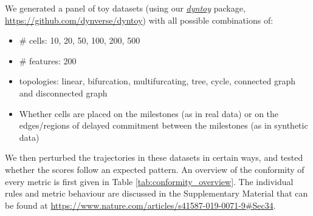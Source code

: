 We generated a panel of toy datasets (using our \href{https://github.com/dynverse/dyntoy}{\textit{dyntoy}} package, \href{https://github.com/dynverse/dyntoy}{https://github.com/dynverse/dyntoy}) with all possible combinations of:

\begin{itemize}
	\item \# cells: 10, 20, 50, 100, 200, 500
	\item \# features: 200
	\item topologies: linear, bifurcation, multifurcating, tree, cycle, connected graph and disconnected graph
	\item Whether cells are placed on the milestones (as in real data) or on the edges/regions of delayed commitment between the milestones (as in synthetic data)
\end{itemize}

We then perturbed the trajectories in these datasets in certain ways, and tested whether the scores follow an expected pattern. An overview of the conformity of every metric is first given in Table \ref{tab:conformity_overview}. The individual rules and metric behaviour are discussed in the Supplementary Material that can be found at \href{https://www.nature.com/articles/s41587-019-0071-9\#Sec34}{https://www.nature.com/articles/s41587-019-0071-9\#Sec34}.

